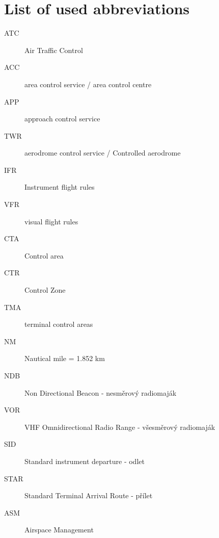 \chapter{List of used abbreviations}

\begin{description}
\item[ATC] Air Traffic Control
\item[ACC] area control service / area control centre
\item[APP] approach control service
\item[TWR] aerodrome control service / Controlled aerodrome
\item[IFR] Instrument flight rules
\item[VFR] visual flight rules
\item[CTA] Control area
\item[CTR] Control Zone
\item[TMA] terminal control areas
\item[NM] Nautical mile = 1.852 km
\item[NDB] Non Directional Beacon - nesměrový radiomaják
\item[VOR] VHF Omnidirectional Radio Range - všesměrový radiomaják
\item[SID] Standard instrument departure - odlet
\item[STAR] Standard Terminal Arrival Route - přílet
\item[ASM] Airspace Management
\end{description}